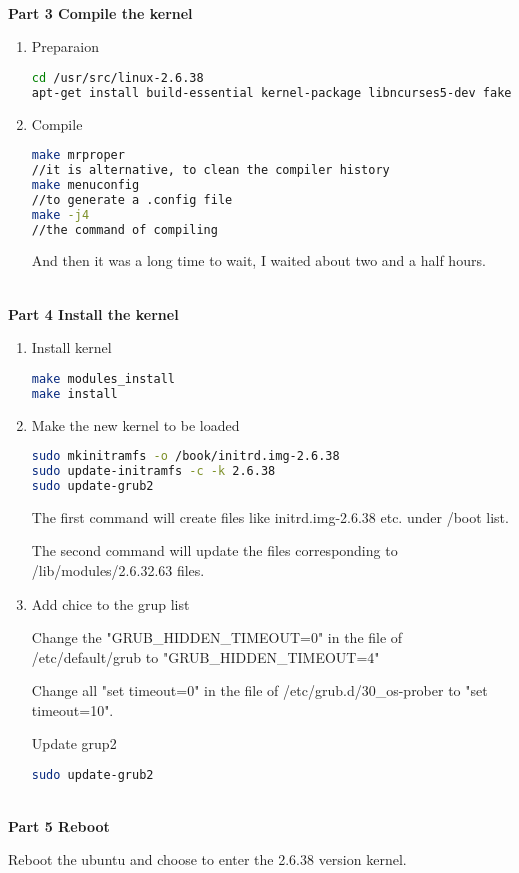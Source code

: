 \documentclass[12pt,a4paper]{article}
\begin{document}
~\\
\textbf{Part 3 Compile the kernel}
\begin{enumerate}
\item Preparaion
\begin{lstlisting}[language=bash]
cd /usr/src/linux-2.6.38
apt-get install build-essential kernel-package libncurses5-dev fakeroot
\end{lstlisting}
\item Compile
\begin{lstlisting}[language=bash]
make mrproper
//it is alternative, to clean the compiler history
make menuconfig
//to generate a .config file
make -j4
//the command of compiling
\end{lstlisting}
\quad And then it was a long time to wait, I waited about two and a half hours.
\end{enumerate}
~\\
\textbf{Part 4 Install the kernel}
\begin{enumerate}
\item Install kernel
\begin{lstlisting}[language=bash]
make modules_install
make install
\end{lstlisting}
\item Make the new kernel to be loaded
\begin{lstlisting}[language=bash]
sudo mkinitramfs -o /book/initrd.img-2.6.38
sudo update-initramfs -c -k 2.6.38
sudo update-grub2
\end{lstlisting}
\quad The first command will create files like initrd.img-2.6.38 etc. under /boot list.

\quad The second command will update the files corresponding to /lib/modules/2.6.32.63 files.
\item Add chice to the grup list

\quad Change the "GRUB\_HIDDEN\_TIMEOUT=0" in the file of /etc/default/grub to "GRUB\_HIDDEN\_TIMEOUT=4"

\quad Change all "set timeout=0" in the file of /etc/grub.d/30\_os-prober to "set timeout=10".

\quad Update grup2
\begin{lstlisting}[language=bash]
sudo update-grub2
\end{lstlisting}
\end{enumerate}
~\\
\textbf{Part 5 Reboot}

\quad Reboot the ubuntu and choose to enter the 2.6.38 version kernel.
\end{document}
